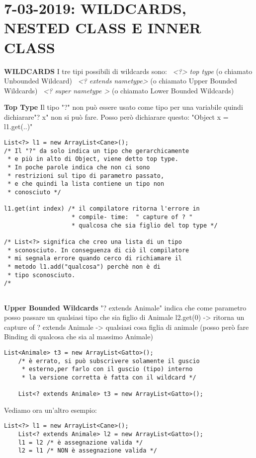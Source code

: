 

\newpage
\section{7-03-2019: WILDCARDS, NESTED CLASS E INNER CLASS}
\textbf{WILDCARDS} \newline
I tre tipi possibili di wildcards sono: \newline
\textbullet\ \textit{<?> top type} (o chiamato Unbounded Wildcard) \newline
\textbullet\ \textit{<? extends nametype>} (o chiamato Upper Bounded Wildcards)\newline
\textbullet\ \textit{<? super nametype >} (o chiamato Lower Bounded Wildcards)\newline

\noindent \textbf{Top Type} \newline
Il tipo "?" non può essere usato come tipo per una variabile quindi dichiarare"? x" non si può fare. Posso però dichiarare questo: "Object x = l1.get(..)"
\begin{lstlisting}[basicstyle=\small,]
List<?> l1 = new ArrayList<Cane>();
/* Il "?" da solo indica un tipo che gerarchicamente
 * e più in alto di Object, viene detto top type.
 * In poche parole indica che non ci sono 
 * restrizioni sul tipo di parametro passato,
 * e che quindi la lista contiene un tipo non
 * conosciuto */

l1.get(int index) /* il compilatore ritorna l'errore in
				   * compile- time:  " capture of ? " 
				   * qualcosa che sia figlio del top type */
				   
/* List<?> significa che creo una lista di un tipo
 * sconosciuto. In conseguenza di ciò il compilatore 
 * mi segnala errore quando cerco di richiamare il
 * metodo l1.add("qualcosa") perchè non è di
 * tipo sconosciuto.	
/*
			   
\end{lstlisting}

\noindent \textbf{Upper Bounded Wildcards} \newline
"? extends Animale" indica che come parametro posso passare un qualsiasi tipo che sia figlio di Animale \newline
l2.get(0) -> ritorna un capture of ? extends Animale -> qualsiasi cosa figlia di animale (posso però fare Binding di qualcosa che sia al massimo Animale) \newline

\begin{lstlisting}[basicstyle=\small,]
	List<Animale> t3 = new ArrayList<Gatto>();
	/* è errato, si può subscrivere solamente il guscio
	 * esterno,per farlo con il guscio (tipo) interno
	 * la versione corretta è fatta con il wildcard */
	
	List<? extends Animale> t3 = new ArrayList<Gatto>();
\end{lstlisting}
Vediamo ora un'altro esempio:
\begin{lstlisting}[basicstyle=\small,]
	List<?> l1 = new ArrayList<Cane>();
	List<? extends Animale> l2 = new ArrayList<Gatto>();
	l1 = l2 /* è assegnazione valida */
	l2 = l1 /* NON è assegnazione valida */
\end{lstlisting}

